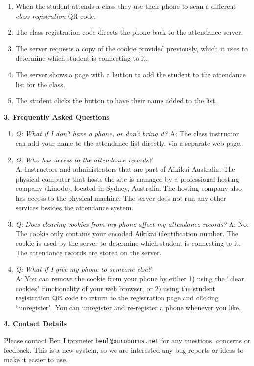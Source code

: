 \begin{minipage}[t]{\dimexpr0.5\linewidth-1em}
\begin{center}
\begin{enumerate}
\item When the student attends a class they use their phone to scan
      a different \emph{class registration} QR code.
\item The class registration code directs the phone back to the
      attendance server.
\item The server requests a copy of the cookie provided previously,
      which it uses to determine which student is connecting to it.
\item The server shows a page with a button to add the
      student to the attendance list for the class.
\item The student clicks the button to have their name added to the list.
\end{enumerate}
\end{center}


\smallskip
\textbf{3. Frequently Asked Questions}
\begin{enumerate}
\item \emph{Q: What if I don't have a phone, or don't bring it?}
      A: The class instructor can add your name to the attendance list
         directly, via a separate web page.

\item \emph{Q: Who has access to the attendance records?} \\
      A: Instructors and administrators that are part of Aikikai Australia.
         The physical computer that hosts the site is managed by a professional
         hosting company (Linode), located in Sydney, Australia. The hosting company
         also has access to the physical machine. The server does not run any other
         services besides the attendance system.

\item \emph{Q: Does clearing cookies from my phone affect my attendance records?}
      A: No. The cookie only contains your encoded Aikikai identification number.
         The cookie is used by the server to determine which student
         is connecting to it. The attendance records are stored on the server.

\item \emph{Q: What if I give my phone to someone else?} \\
      A: You can remove the cookie from your phone by either 1) using the ``clear cookies"
         functionality of your web browser, or 2) using the student registration QR code to return
         to the registration page and clicking ``unregister". You can unregister
         and re-register a phone whenever you like.
\end{enumerate}


\medskip
\textbf{4. Contact Details}

Please contact Ben Lippmeier \texttt{benl@ouroborus.net} for
any questions, concerns or feedback.
This is a new system, so we are interested any bug reports or
ideas to make it easier to use.
\end{minipage}
